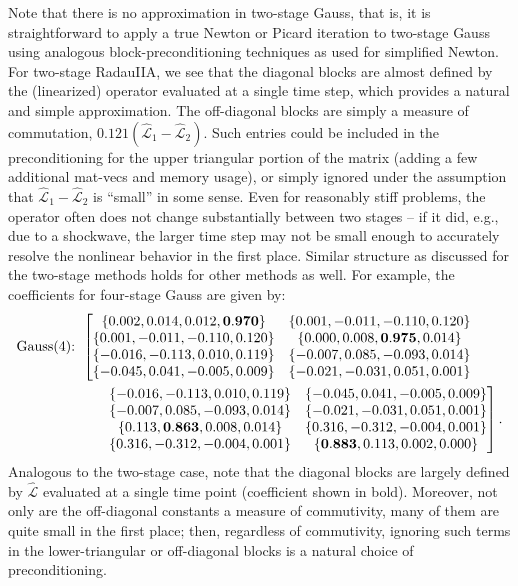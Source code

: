 \documentclass[review]{siamart}
\begin{document}
Note that there is no approximation in two-stage Gauss, that is, it is
straightforward to apply a true Newton or Picard iteration to two-stage Gauss
using analogous block-preconditioning techniques as used for simplified Newton.
For two-stage RadauIIA, we see that the diagonal blocks are almost
defined by the (linearized) operator evaluated at a single time step, which
provides a natural and simple approximation. The off-diagonal blocks are
simply a measure of commutation, $0.121(\widehat{\mathcal{L}}_1 - \widehat{\mathcal{L}}_2)$.
Such entries could be included in the preconditioning for the upper
triangular portion of the matrix (adding a few additional mat-vecs and
memory usage), or simply ignored under the assumption that $\widehat{\mathcal{L}}_1 -
\widehat{\mathcal{L}}_2$ is ``small'' in some sense. Even for reasonably stiff
problems, the operator often does not change substantially between
two stages -- if it did, e.g., due to a shockwave, the larger time step
may not be small enough to accurately resolve the nonlinear behavior in
the first place. Similar structure as discussed for the two-stage methods
holds for other methods as well. For example, the coefficients for four-stage
Gauss are given by:
%
\begin{align*}
\textnormal{Gauss(4):}& \hspace{1ex}
\left[\begin{matrix}
\{0.002,0.014,0.012,\mathbf{0.970}\} & \{0.001,-0.011,-0.110,0.120\} \\
\{0.001,-0.011,-0.110,0.120\} & \{0.000,0.008,\mathbf{0.975},0.014\} \\
\{-0.016,-0.113,0.010,0.119\} & \{-0.007,0.085,-0.093,0.014\} \\
\{-0.045,0.041,-0.005,0.009\} & \{-0.021,-0.031,0.051,0.001\}
\end{matrix}\right.
\\&\hspace{5ex}
\left.\begin{matrix}
\{-0.016,-0.113,0.010,0.119\} & \{-0.045,0.041,-0.005,0.009\}\\
\{-0.007,0.085,-0.093,0.014\} & \{-0.021,-0.031,0.051,0.001\}\\
\{0.113,\mathbf{0.863},0.008,0.014\} & \{0.316,-0.312,-0.004,0.001\}\\
\{0.316,-0.312,-0.004,0.001\} & \{\mathbf{0.883},0.113,0.002,0.000\}\\
\end{matrix}\right].
\end{align*}
%
Analogous to the two-stage case, note that the diagonal blocks are largely
defined by $\widehat{\mathcal{L}}$ evaluated at a single time point (coefficient
shown in bold). Moreover, not only are the off-diagonal constants
a measure of commutivity, many of them are quite small in the first place;
then, regardless of commutivity, ignoring such terms in the lower-triangular
or off-diagonal blocks is a natural choice of preconditioning.
\end{document}
